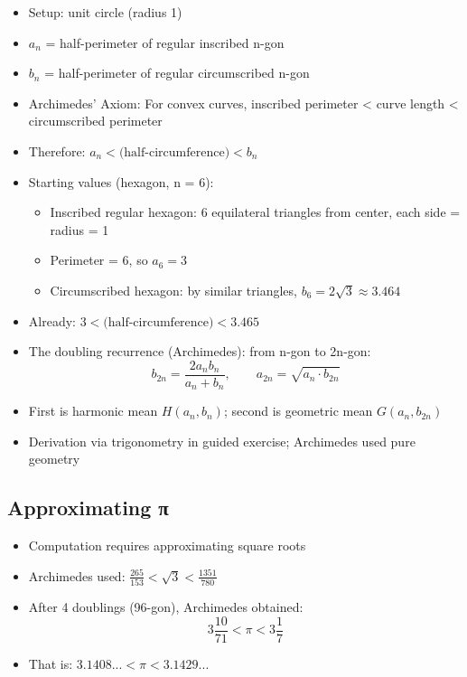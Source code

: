 \documentclass[
  10pt,
  letterpaper,
]{scrbook}
\providecommand{\tightlist}{%
  \setlength{\itemsep}{0pt}\setlength{\parskip}{0pt}}
\begin{document}
\begin{itemize}
\tightlist
\item
  Setup: unit circle (radius 1)
\item
  \(a_n\) = half-perimeter of regular inscribed n-gon
\item
  \(b_n\) = half-perimeter of regular circumscribed n-gon
\item
  Archimedes' Axiom: For convex curves, inscribed perimeter \textless{}
  curve length \textless{} circumscribed perimeter
\item
  Therefore: \(a_n < \text{(half-circumference)} < b_n\)
\item
  Starting values (hexagon, n = 6):

  \begin{itemize}
  \tightlist
  \item
    Inscribed regular hexagon: 6 equilateral triangles from center, each
    side = radius = 1
  \item
    Perimeter = 6, so \(a_6 = 3\)
  \item
    Circumscribed hexagon: by similar triangles,
    \(b_6 = 2\sqrt{3} \approx 3.464\)
  \end{itemize}
\item
  Already: \(3 < \text{(half-circumference)} < 3.465\)
\item
  The doubling recurrence (Archimedes): from n-gon to 2n-gon:
  \[b_{2n} = \frac{2a_n b_n}{a_n + b_n}, \qquad a_{2n} = \sqrt{a_n \cdot b_{2n}}\]
\item
  First is harmonic mean \(H(a_n, b_n)\); second is geometric mean
  \(G(a_n, b_{2n})\)
\item
  Derivation via trigonometry in guided exercise; Archimedes used pure
  geometry
\end{itemize}

\subsection{Approximating π}\label{approximating-ux3c0}

\begin{itemize}
\tightlist
\item
  Computation requires approximating square roots
\item
  Archimedes used: \(\frac{265}{153} < \sqrt{3} < \frac{1351}{780}\)
\item
  After 4 doublings (96-gon), Archimedes obtained:
  \[3\frac{10}{71} < \pi < 3\frac{1}{7}\]
\item
  That is: \(3.1408... < \pi < 3.1429...\)
\end{itemize}
\end{document}
